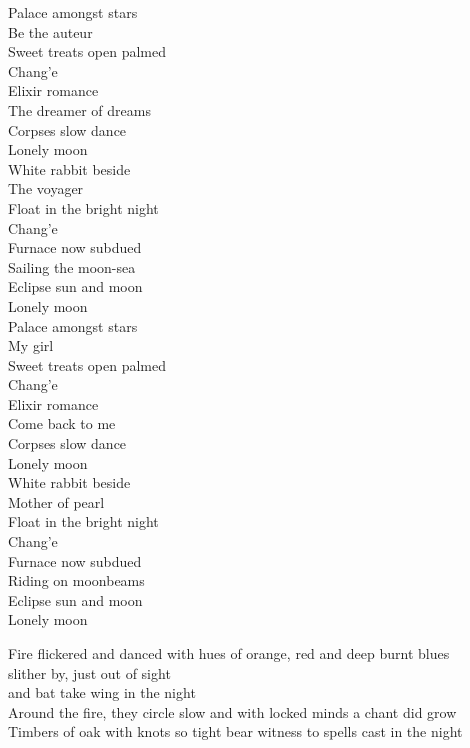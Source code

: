 Palace amongst stars \\
Be the auteur \\
Sweet treats open palmed \\
Chang'e \\
Elixir romance \\
The dreamer of dreams \\
Corpses slow dance \\
Lonely moon \\
White rabbit beside \\
The voyager \\
Float in the bright night \\
Chang'e \\
Furnace now subdued \\
Sailing the moon-sea \\
Eclipse sun and moon \\
Lonely moon \\

Palace amongst stars \\
My girl \\
Sweet treats open palmed \\
Chang'e \\
Elixir romance \\
Come back to me \\
Corpses slow dance \\
Lonely moon \\
White rabbit beside \\
Mother of pearl \\
Float in the bright night \\
Chang'e \\
Furnace now subdued \\
Riding on moonbeams \\
Eclipse sun and moon \\
Lonely moon \\


Fire flickered and danced with hues of orange, red and deep burnt blues \\
 slither by, just out of sight \\
 and bat take wing in the night \\
Around the fire, they circle slow and with locked minds a chant did grow \\
Timbers of oak with knots so tight bear witness to spells cast in the night \\

